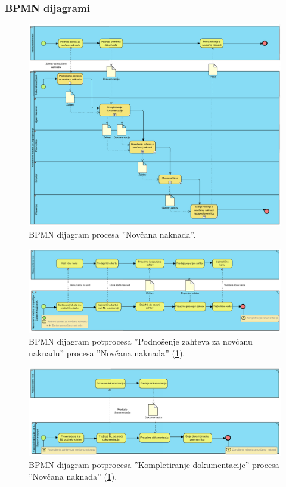 \begin{mylandscape}
	\subsubsection{BPMN dijagrami}
	
	\begin{figure}[H]
		\centering
		\includegraphics[width=0.6\paperwidth]{dijagrami/bpmn-dijagrami/bpmn-1.png}
		\caption{BPMN dijagram procesa ''Nov\v cana naknada''.}
		\label{bpmnd: novcana naknada}
	\end{figure}
	
	\newpage
	
	\begin{figure}[H]
		\centering
		\includegraphics[width=0.6\paperwidth]{dijagrami/bpmn-dijagrami/bpmn-2.png}
		\caption{BPMN dijagram potprocesa ''Podno\v senje zahteva za nov\v canu naknadu'' procesa ''Nov\v cana naknada'' (\ref{bpmnd: novcana naknada}).}
	\end{figure}
	
	\begin{figure}[H]
		\centering
		\includegraphics[width=0.6\paperwidth]{dijagrami/bpmn-dijagrami/bpmn-3.png}
		\caption{BPMN dijagram potprocesa ''Kompletiranje dokumentacije'' procesa ''Nov\v cana naknada'' (\ref{bpmnd: novcana naknada}).}
	\end{figure}


\end{mylandscape}
